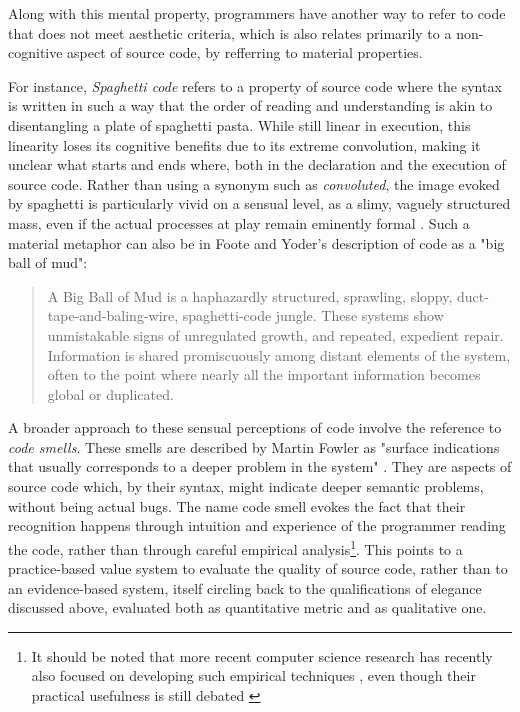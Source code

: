 Along with this mental property, programmers have another way to refer to code that does not meet aesthetic criteria, which is also relates primarily to a non-cognitive aspect of source code, by refferring to material properties.

For instance, \emph{Spaghetti code} refers to a property of source code where the syntax is written in such a way that the order of reading and understanding is akin to disentangling a plate of spaghetti pasta. While still linear in execution, this linearity loses its cognitive benefits due to its extreme convolution, making it unclear what starts and ends where, both in the declaration and the execution of source code. Rather than using a synonym such as \emph{convoluted}, the image evoked by spaghetti is particularly vivid on a sensual level, as a slimy, vaguely structured mass, even if the actual processes at play remain eminently formal \citep{steele_macaroni_1977}. Such a material metaphor can also be in Foote and Yoder's description of code as a "big ball of mud":

\begin{quote}
  A Big Ball of Mud is a haphazardly structured, sprawling, sloppy, duct-tape-and-baling-wire, spaghetti-code jungle. These systems show unmistakable signs of unregulated growth, and repeated, expedient repair. Information is shared promiscuously among distant elements of the system, often to the point where nearly all the important information becomes global or duplicated. \citep{foote_big_1997}
\end{quote}

A broader approach to these sensual perceptions of code involve the reference to \emph{code smells}. These smells are described by Martin Fowler as "surface indications that usually corresponds to a deeper problem in the system" \citep{fowler_refactoring_1999}. They are aspects of source code which, by their syntax, might indicate deeper semantic problems, without being actual bugs. The name code smell evokes the fact that their recognition happens through intuition and experience of the programmer reading the code, rather than through careful empirical analysis\footnote{It should be noted that more recent computer science research has recently also focused on developing such empirical techniques \citep{rasool_review_2015}, even though their practical usefulness is still debated \citep{santos_systematic_2018}}. This points to a practice-based value system to evaluate the quality of source code, rather than to an evidence-based system, itself circling back to the qualifications of elegance discussed above, evaluated both as quantitative metric and as qualitative one.

